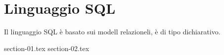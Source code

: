 \chapter{Linguaggio SQL}%
\label{cha:Linguaggio SQL}

Il linguaggio SQL è basato sui modell relazioneli, è di tipo dichiarativo.

{section-01.tex}
{section-02.tex}
